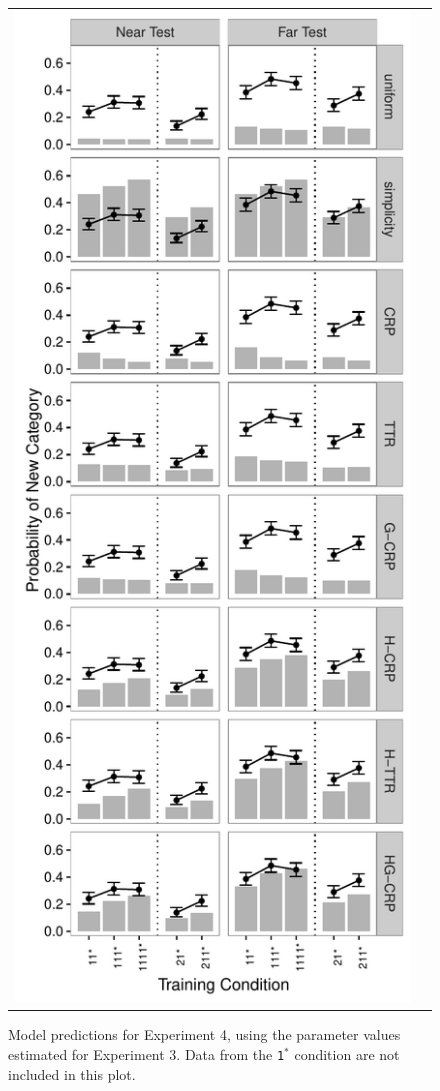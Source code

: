 \documentclass[doc]{apa6}
\newcommand{\dist}[1]{\texttt{#1}}
\begin{document}
\begin{figure}[t]
\begin{center}
\begin{tabular}{cc}
\includegraphics[scale=.5]{expt4na.pdf}
\end{tabular}
\caption{Model predictions for Experiment 4, using the parameter values estimated for Experiment 3. Data from the \dist{1$^*$} condition are not included in this plot.}
\label{fig:exp4model}
\end{center}
\end{figure}
\end{document}
